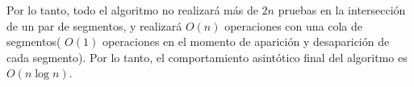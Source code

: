 Por lo tanto, todo el algoritmo no realizará más de $2n$ pruebas en la intersección de un par de 
segmentos, y realizará $O(n)$ operaciones con una cola de segmentos( $O(1)$ operaciones en el momento de 
aparición y desaparición de cada segmento). Por lo tanto, el comportamiento asintótico final del 
algoritmo es $O(n\log n)$.